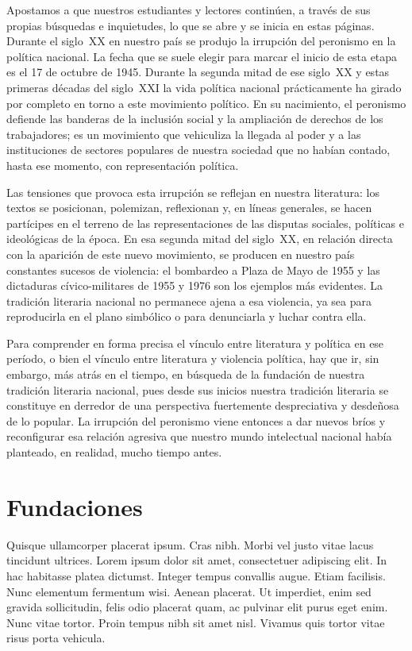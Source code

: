 Apostamos a que nuestros estudiantes y lectores continúen, a través de sus propias búsquedas e inquietudes, lo que se abre y se inicia en estas páginas. Durante el siglo~XX en nuestro país se produjo la irrupción del peronismo en la política nacional. La fecha que se suele elegir para marcar el inicio de esta etapa es el 17 de octubre de 1945. Durante la segunda mitad de ese siglo~XX y estas primeras décadas del siglo~XXI la vida política nacional prácticamente ha girado por completo en torno a este movimiento político. En su nacimiento, el peronismo defiende las banderas de la inclusión social y la ampliación de derechos de los trabajadores; es un movimiento que vehiculiza la llegada al poder y a las instituciones de sectores populares de nuestra sociedad que no habían contado, hasta ese momento, con representación política.

Las tensiones que provoca esta irrupción se reflejan en nuestra literatura: los textos se posicionan, polemizan, reflexionan y, en líneas generales, se hacen partícipes en el terreno de las representaciones de las disputas sociales, políticas e ideológicas de la época. En esa segunda mitad del siglo~XX, en relación directa con la aparición de este nuevo movimiento, se producen en nuestro país constantes sucesos de violencia: el bombardeo a Plaza de Mayo de 1955 y las dictaduras cívico-militares de 1955 y 1976 son los ejemplos más evidentes. La tradición literaria nacional no permanece ajena a esa violencia, ya sea para reproducirla en el plano simbólico o para denunciarla y luchar contra ella.

Para comprender en forma precisa el vínculo entre literatura y política en ese período, o bien el vínculo entre literatura y violencia política, hay que ir, sin embargo, más atrás en el tiempo, en búsqueda de la fundación de nuestra tradición literaria nacional, pues desde sus inicios nuestra tradición literaria se constituye en derredor de una perspectiva fuertemente despreciativa y desdeñosa de lo popular. La irrupción del peronismo viene entonces a dar nuevos bríos y reconfigurar esa relación agresiva que nuestro mundo intelectual nacional había planteado, en realidad, mucho tiempo antes.

\mainmatter

\chapter{Fundaciones}

Quisque ullamcorper placerat ipsum. Cras nibh. Morbi vel justo vitae lacus tincidunt ultrices. Lorem ipsum dolor sit amet, consectetuer adipiscing elit. In hac habitasse platea dictumst. Integer tempus convallis augue. Etiam facilisis. Nunc elementum fermentum wisi. Aenean placerat. Ut imperdiet, enim sed gravida sollicitudin, felis odio placerat quam, ac pulvinar elit purus eget enim. Nunc vitae tortor. Proin tempus nibh sit amet nisl. Vivamus quis tortor vitae risus porta vehicula.

